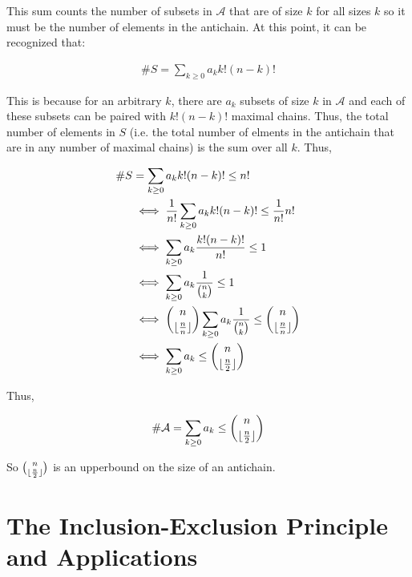 \documentclass{report}
\begin{document}
\begin{subproof}
    This sum counts the number of subsets in $\mathcal{A}$ that are of size $k$ for
    all sizes $k$ so it must be the number of elements in the antichain. At this point,
    it can be recognized that:

    \begin{align*}
        \#S = \sum_{k \ge 0} a_k k!(n-k)!
    \end{align*}

    This is because for an arbitrary $k$, there are $a_k$ subsets of size $k$ in
    $\mathcal{A}$ and each of these subsets can be paired with $k!(n-k)!$ maximal chains.
    Thus, the total number of elements in $S$ (i.e. the total number of elments in the
    antichain that are in any number of maximal chains) is the sum over all $k$. Thus,

    \begin{align*}
        \#S & = \sum_{k \ge 0} a_k k!(n-k)! \le n!                                                                             \\
            & \iff \frac{1}{n!} \sum_{k \ge 0} a_k k!(n-k)! \le \frac{1}{n!} n!                                                \\
            & \iff \sum_{k \ge 0} a_k \frac{k!(n-k)!}{n!} \le 1                                                                \\
            & \iff \sum_{k \ge 0} a_k \frac{1}{\binom{n}{k}} \le 1                                                             \\
            & \iff \binom{n}{\lfloor\frac{n}{n}\rfloor} \sum_{k \ge 0} a_k \frac{1}{\binom{n}{k}} \le \binom{n}{\lfloor\frac{n}{n}\rfloor} \\
            & \iff \sum_{k \ge 0} a_k \le \binom{n}{\lfloor\frac{n}{2}\rfloor}
    \end{align*}

    Thus,

    \begin{align*}
        \#\mathcal{A} = \sum_{k \ge 0} a_k \le \binom{n}{\lfloor\frac{n}{2}\rfloor}
    \end{align*}

    So $\binom{n}{\lfloor\frac{n}{2}\rfloor}$ is an upperbound on the size of an antichain.
\end{subproof}

\chapter{The Inclusion-Exclusion Principle and Applications}
\end{document}
